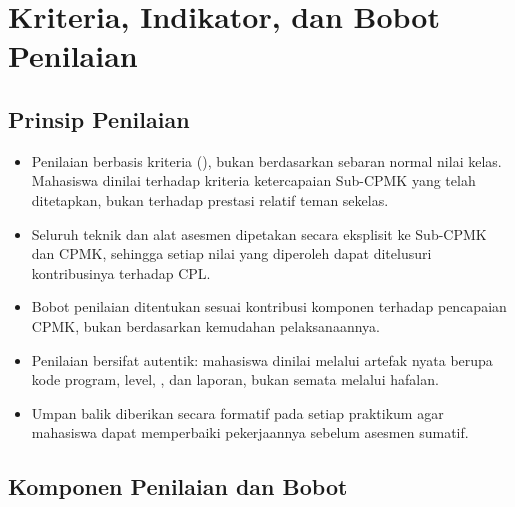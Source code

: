 
\section{Kriteria, Indikator, dan Bobot Penilaian}
\label{sec:penilaian}

\subsection{Prinsip Penilaian}

\begin{itemize}
  \item Penilaian berbasis kriteria (), bukan
        berdasarkan sebaran normal nilai kelas. Mahasiswa dinilai terhadap
        kriteria ketercapaian Sub-CPMK yang telah ditetapkan, bukan terhadap
        prestasi relatif teman sekelas.
  \item Seluruh teknik dan alat asesmen dipetakan secara eksplisit ke Sub-CPMK
        dan CPMK, sehingga setiap nilai yang diperoleh dapat ditelusuri
        kontribusinya terhadap CPL.
  \item Bobot penilaian ditentukan sesuai kontribusi komponen terhadap
        pencapaian CPMK, bukan berdasarkan kemudahan pelaksanaannya.
  \item Penilaian bersifat autentik: mahasiswa dinilai melalui artefak nyata
        berupa kode program, level, , dan laporan, bukan semata
        melalui hafalan.
  \item Umpan balik diberikan secara formatif pada setiap praktikum agar
        mahasiswa dapat memperbaiki pekerjaannya sebelum asesmen sumatif.
\end{itemize}

\subsection{Komponen Penilaian dan Bobot}


